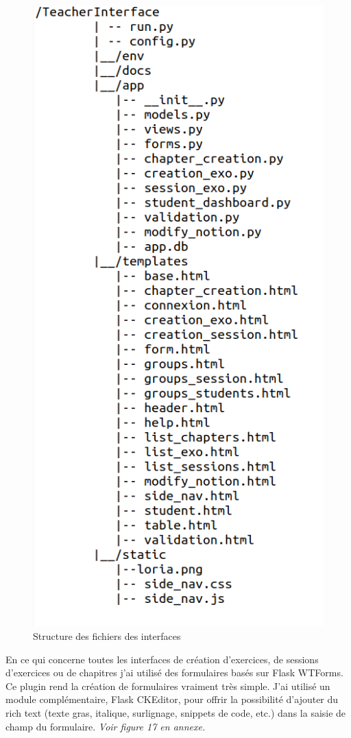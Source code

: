 \documentclass[12pt]{article}
\begin{document}
\begin{figure}[h]
    \centering
    \includegraphics[scale=0.4]{structure_Flask.png}
    \caption{Structure des fichiers des interfaces}
    \label{fig:structure_flask}
\end{figure}


En ce qui concerne toutes les interfaces de création d’exercices, de sessions d’exercices ou de chapitres j’ai utilisé des formulaires basés sur Flask WTForms. Ce plugin rend la création de formulaires vraiment très simple. J'ai utilisé un module complémentaire, Flask CKEditor, pour offrir la possibilité d'ajouter du rich text (texte gras, italique, surlignage, snippets de code, etc.) dans la saisie de champ du formulaire. \textit{Voir figure 17 en annexe.} \\ 
\end{document}
